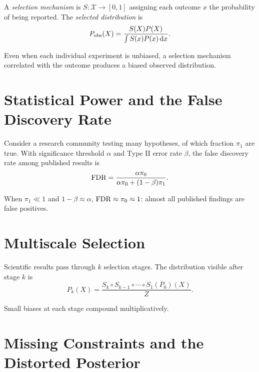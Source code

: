 \begin{definition}
A \emph{selection mechanism} is $S : \mathcal{X} \to [0,1]$ assigning each outcome $x$ the probability of being reported. The \emph{selected distribution} is
\[
P_{\rm obs}(X) = \frac{S(X) P(X)}{\int S(x) P(x) \,\mathrm{d} x}.
\]
\end{definition}

\begin{proposition}
Even when each individual experiment is unbiased, a selection mechanism correlated with the outcome produces a biased observed distribution.
\end{proposition}

\section{Statistical Power and the False Discovery Rate}

Consider a research community testing many hypotheses, of which fraction $\pi_1$ are true. With significance threshold $\alpha$ and Type II error rate $\beta$, the false discovery rate among published results is
\begin{equation}
\label{eq:fdr}
\mathrm{FDR} = \frac{\alpha \pi_0}{\alpha \pi_0 + (1-\beta)\pi_1}.
\end{equation}

\begin{proposition}
When $\pi_1 \ll 1$ and $1-\beta \approx \alpha$, $\mathrm{FDR} \approx \pi_0 \approx 1$: almost all published findings are false positives.
\end{proposition}

\section{Multiscale Selection}

Scientific results pass through $k$ selection stages. The distribution visible after stage $k$ is
\begin{equation}
\label{eq:multiscale}
P_k(X) = \frac{S_k \circ S_{k-1} \circ \cdots \circ S_1(P_0)(X)}{Z}.
\end{equation}

Small biases at each stage compound multiplicatively.

\section{Missing Constraints and the Distorted Posterior}

